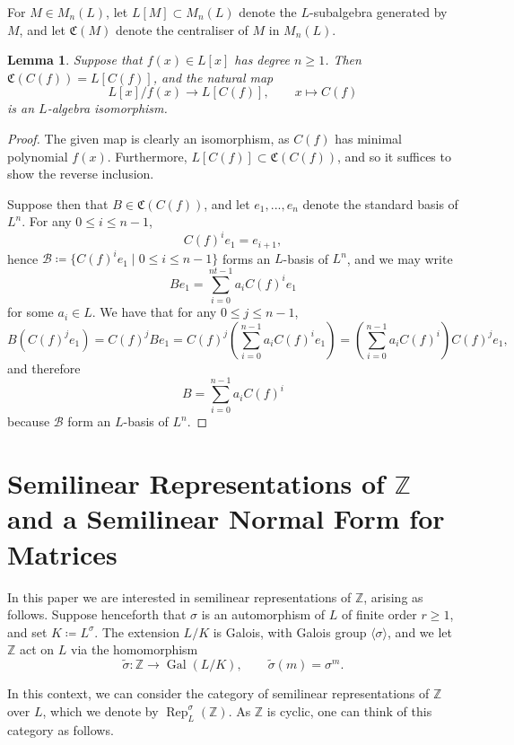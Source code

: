 \documentclass[10pt, reqno, hidelinks]{amsart}
\DeclareMathOperator{\Gal}{Gal}
\DeclareMathOperator{\Rep}{Rep}
\newcommand{\bZ}{{\mathbb Z}}
\newcommand{\sB}{{\mathcal B}}
\newcommand{\fC}{{\mathfrak C}}
\numberwithin{thm}{subsection}
\newtheorem{lemma}[thm]{Lemma}
\theoremstyle{definition}
\begin{document}
For $M \in M_n(L)$, let $L[M] \subset M_n(L)$ denote the $L$-subalgebra generated by $M$, and let $\fC(M)$ denote the centraliser of $M$ in $M_n(L)$.

\begin{lemma}\label{lem:centralisercyclicmodule}
	Suppose that $f(x) \in L[x]$ has degree $n \geq 1$. Then $\fC(C(f)) = L[C(f)]$, and the natural map
	\[
	L[x] / f(x) \rightarrow L[C(f)], \qquad x \mapsto C(f)
	\]
	is an $L$-algebra isomorphism.
\end{lemma}

\begin{proof}
	The given map is clearly an isomorphism, as $C(f)$ has minimal polynomial $f(x)$. Furthermore, $L[C(f)] \subset \fC(C(f))$, and so it suffices to show the reverse inclusion.
	
	Suppose then that $B \in \fC(C(f))$, and let $e_1, ... , e_n$ denote the standard basis of $L^n$. For any $0 \leq i \leq n-1$,
	\[
	C(f)^i e_1 = e_{i+1},
	\]
	hence $\sB \coloneqq \{C(f)^i e_1\mid 0 \leq i \leq n - 1\}$ forms an $L$-basis of $L^n$, and we may write
	\[
	B e_1 = \sum_{i = 0}^{nt - 1} a_i C(f)^i e_1
	\]
	for some $a_i \in L$. We have that for any $0 \leq j \leq n - 1$,
	\[
		B (C(f)^j e_1) = C(f)^j B e_1 =  C(f)^j \left(\sum_{i = 0}^{n - 1} a_i C(f)^{i} e_1 \right) = \left(\sum_{i = 0}^{n - 1} a_i C(f)^i\right) C(f)^j e_1,
	\]
	and therefore
	\[
	B = \sum_{i = 0}^{n - 1} a_i C(f)^i
	\]
	because $\sB$ form an $L$-basis of $L^{n}$.
\end{proof}

\section{Semilinear Representations of $\bZ$ and a Semilinear Normal Form for Matrices}\label{sect:semilinearbackground}

In this paper we are interested in semilinear representations of $\bZ$, arising as follows. Suppose henceforth that $\sigma$ is an automorphism of $L$ of finite order $r \geq 1$, and set $K \coloneqq L^{\sigma}$. The extension $L/K$ is Galois, with Galois group $\langle \sigma \rangle$, and we let $\bZ$ act on $L$ via the homomorphism
\[
\tilde{\sigma} \colon \bZ \rightarrow \Gal(L/K), \qquad \tilde{\sigma}(m) = \sigma^m.
\]

In this context, we can consider the category of semilinear representations of $\bZ$ over $L$, which we denote by $\Rep_L^{\sigma}(\bZ)$. As $\bZ$ is cyclic, one can think of this category as follows.
\end{document}
